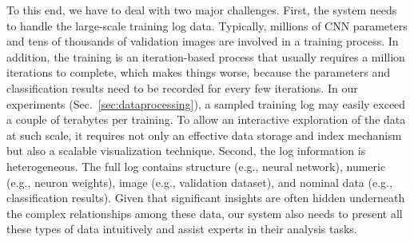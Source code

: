 \documentclass[format=acmsmall, review=false, screen=true]{acmart}
\begin{document}
To this end, we have to deal with two major challenges.
First, the system needs to handle the large-scale training log data.
Typically, millions of CNN parameters and tens of thousands of validation images are involved in a training process.
In addition, the training is an iteration-based process that usually requires a million iterations to complete, which makes things worse, because the parameters and classification results need to be recorded for every few iterations.
In our experiments (Sec.~\ref{sec:dataprocessing}), a sampled training log may easily exceed a couple of terabytes per training.
To allow an interactive exploration of the data at such scale, it requires not only an effective data storage and index mechanism but also a scalable visualization technique.
Second, the log information is heterogeneous.
The full log contains structure (e.g., neural network), numeric (e.g., neuron weights), image (e.g., validation dataset), and nominal data (e.g., classification results).
Given that significant insights are often hidden underneath the complex relationships among these data, our system also needs to present all these types of data intuitively and assist experts in their analysis tasks.
\end{document}
